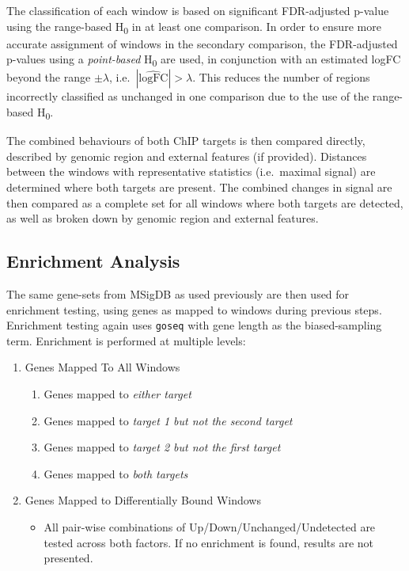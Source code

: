\documentclass[
]{book}
\providecommand{\tightlist}{%
  \setlength{\itemsep}{0pt}\setlength{\parskip}{0pt}}
\begin{document}
The classification of each window is based on significant FDR-adjusted p-value using the range-based H\textsubscript{0} in at least one comparison.
In order to ensure more accurate assignment of windows in the secondary comparison, the FDR-adjusted p-values using a \emph{point-based} H\textsubscript{0} are used, in conjunction with an estimated logFC beyond the range \(\pm\lambda\), i.e.~\(|\widehat{\text{logFC}}| > \lambda\).
This reduces the number of regions incorrectly classified as unchanged in one comparison due to the use of the range-based H\textsubscript{0}.

The combined behaviours of both ChIP targets is then compared directly, described by genomic region and external features (if provided).
Distances between the windows with representative statistics (i.e.~maximal signal) are determined where both targets are present.
The combined changes in signal are then compared as a complete set for all windows where both targets are detected, as well as broken down by genomic region and external features.

\hypertarget{enrichment-analysis}{%
\subsection*{Enrichment Analysis}\label{enrichment-analysis}}

The same gene-sets from MSigDB\citep{msigdb} as used previously are then used for enrichment testing, using genes as mapped to windows during previous steps.
Enrichment testing again uses \texttt{goseq} with gene length as the biased-sampling term.
Enrichment is performed at multiple levels:

\begin{enumerate}
\def\labelenumi{\arabic{enumi}.}
\tightlist
\item
  Genes Mapped To All Windows

  \begin{enumerate}
  \def\labelenumii{\arabic{enumii}.}
  \tightlist
  \item
    Genes mapped to \emph{either target}
  \item
    Genes mapped to \emph{target 1 but not the second target}
  \item
    Genes mapped to \emph{target 2 but not the first target}
  \item
    Genes mapped to \emph{both targets}
  \end{enumerate}
\item
  Genes Mapped to Differentially Bound Windows

  \begin{itemize}
  \tightlist
  \item
    All pair-wise combinations of Up/Down/Unchanged/Undetected are tested across both factors. If no enrichment is found, results are not presented.
  \end{itemize}
\end{enumerate}
\end{document}
